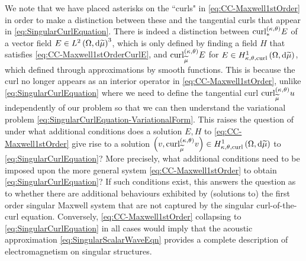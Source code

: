 We note that we have placed asterisks on the ``curls" in \eqref{eq:CC-Maxwell1stOrder} in order to make a distinction between these and the tangential curls that appear in \eqref{eq:SingularCurlEquation}.
There is indeed a distinction between $\mathrm{curl}_{*}^{\left( \kappa, \theta \right)}E$ of a vector field $E\in L^{2}\left( \Omega,\mathrm{d} \widetilde{\mu} \right)^3$, which is only defined by finding a field $H$ that satisfies \eqref{eq:CC-Maxwell1stOrderCurlE}, and $\mathrm{curl}_{\widetilde{\mu}}^{\left( \kappa, \theta \right)}E$ for $E\in H^1_{\kappa,\theta,\mathrm{curl}}\left( \Omega, \mathrm{d}\widetilde{\mu} \right)$, which defined through approximations by smooth functions.
This is because the curl no longer appears as an interior operator in \eqref{eq:CC-Maxwell1stOrder}, unlike \eqref{eq:SingularCurlEquation} where we need to define the tangential curl $\mathrm{curl}_{\widetilde{\mu}}^{\left( \kappa, \theta \right)}u$ independently of our problem so that we can then understand the variational problem \eqref{eq:SingularCurlEquation-VariationalForm}.
This raises the question of under what additional conditions does a solution $E,H$ to \eqref{eq:CC-Maxwell1stOrder} give rise to a solution $\left( v, \mathrm{curl}_{\widetilde{\mu}}^{\left( \kappa, \theta \right)}v  \right)\in H^1_{\kappa,\theta,\mathrm{curl}}\left( \Omega, \mathrm{d}\widetilde{\mu} \right)$ to \eqref{eq:SingularCurlEquation}?
More precisely, what additional conditions need to be imposed upon the more general system \eqref{eq:CC-Maxwell1stOrder} to obtain \eqref{eq:SingularCurlEquation}?
If such conditions exist, this answers the question as to whether there are additional behaviours exhibited by (solutions to) the first order singular Maxwell system that are not captured by the singular curl-of-the-curl equation.
Conversely, \eqref{eq:CC-Maxwell1stOrder} collapsing to \eqref{eq:SingularCurlEquation} in all cases would imply that the acoustic approximation \eqref{eq:SingularScalarWaveEqn} provides a complete description of electromagnetism on singular structures.

